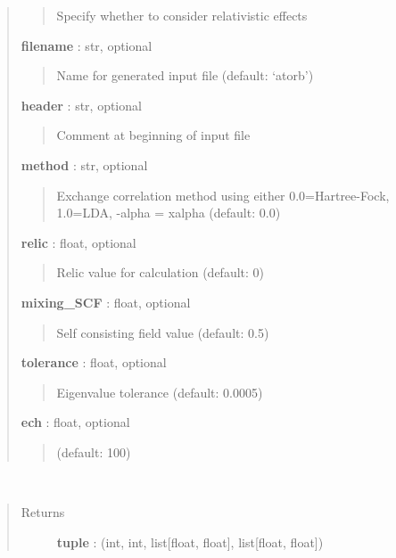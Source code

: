\documentclass[letterpaper,10pt,english]{sphinxmanual}
\begin{document}
\begin{fulllineitems}
\begin{fulllineitems}
\begin{quote}
\begin{description}
\begin{quote}
Specify whether to consider relativistic effects
\end{quote}

\textbf{filename} : str, optional
\begin{quote}

Name for generated input file (default: `atorb')
\end{quote}

\textbf{header} : str, optional
\begin{quote}

Comment at beginning of input file
\end{quote}

\textbf{method} : str, optional
\begin{quote}

Exchange correlation method using either 0.0=Hartree-Fock,
1.0=LDA, -alpha = xalpha (default: 0.0)
\end{quote}

\textbf{relic} : float, optional
\begin{quote}

Relic value for calculation (default: 0)
\end{quote}

\textbf{mixing\_SCF} : float, optional
\begin{quote}

Self consisting field value (default: 0.5)
\end{quote}

\textbf{tolerance} : float, optional
\begin{quote}

Eigenvalue tolerance (default: 0.0005)
\end{quote}

\textbf{ech} : float, optional
\begin{quote}

(default: 100)
\end{quote}

\end{description}\end{quote}

\end{fulllineitems}


\begin{fulllineitems}
\label{modules:phaseshifts.atorb.Atorb.get_quantum_info}~\begin{quote}\begin{description}
\item[{Returns}] \leavevmode
\textbf{tuple} : (int, int, list{[}float, float{]}, list{[}float, float{]})
\begin{quote}


\end{quote}
\end{description}
\end{quote}
\end{fulllineitems}
\end{fulllineitems}
\end{document}
